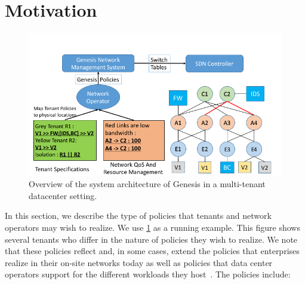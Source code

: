 \section{Motivation}
\begin{figure}
	\includegraphics[width=\columnwidth,center]{figures/architecture.png}
	\caption{Overview of the system architecture of Genesis in a multi-tenant datacenter setting.}
	\label{fig:architecture}
\end{figure}
In this section, we describe the type of policies that tenants and
network operators may wish to realize. %
We use \cref{fig:architecture} as a running example. This figure shows several
tenants who differ in the nature of policies they wish to realize. We
note that these policies reflect and, in some cases, extend the
policies that enterprises realize in their on-site networks today as
well as policies that data center operators support for the different
workloads they host~\cite{mpa-imc15}.  The policies include:





